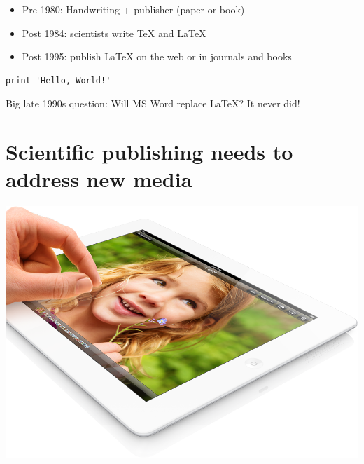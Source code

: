 \documentclass[%
twoside,                 %
final,                   %
chapterprefix=true,      %
open=right               %
10pt]{book}
\begin{document}
\begin{itemize}
 \item Pre 1980: Handwriting + publisher (paper or book)

 \item Post 1984: scientists write TeX and {\LaTeX}

 \item Post 1995: publish {\LaTeX} on the web or in journals and books
\end{itemize}

\noindent
\begin{latexcode:nt}
\providecommand{\shadedskip}{}
\renewenvironment{shadedskip}{
\def\FrameCommand{\colorbox{shadecolor}}\FrameRule0.6pt
\MakeFramed {\FrameRestore}\vskip3mm}{\vskip0mm\endMakeFramed}
\providecommand{\shadedquoteBlue}{}
\renewenvironment{shadedquoteBlue}[1][]{
\bgroup\rmfamily\fboxsep=0mm\relax
\begin{shadedskip}
\list{}{\parsep=-2mm\parskip=0mm\topsep=0pt\leftmargin=2mm
\rightmargin=2\leftmargin\leftmargin=4pt\relax}
\relax}{\endlist\end{shadedskip}\egroup}\begin{shadedquoteBlue}
\fontsize{9pt}{9pt}
\begin{Verbatim}
print 'Hello, World!'
\end{Verbatim}
\end{latexcode:nt}

Big late 1990s question: Will MS Word replace {\LaTeX}? It never did!

\section*{Scientific publishing needs to address new media}


\begin{center}  %
  \centerline{\includegraphics[width=0.8\linewidth]{fig/ipad.png}}
\end{center}
\end{document}

